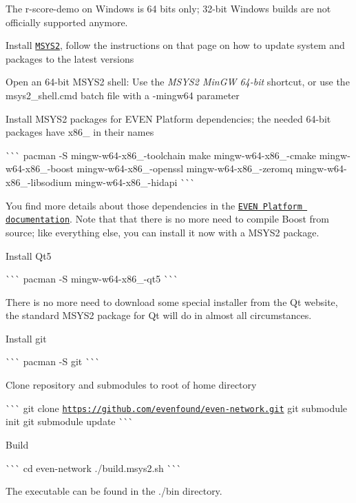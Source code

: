 The r-\/score-\/demo on Windows is 64 bits only; 32-\/bit Windows builds are not officially supported anymore.


\begin{DoxyEnumerate}
\item Install \href{https://www.msys2.org/}{\tt M\+S\+Y\+S2}, follow the instructions on that page on how to update system and packages to the latest versions
\item Open an 64-\/bit M\+S\+Y\+S2 shell\+: Use the {\itshape M\+S\+Y\+S2 Min\+GW 64-\/bit} shortcut, or use the {\ttfamily msys2\+\_\+shell.\+cmd} batch file with a {\ttfamily -\/mingw64} parameter
\item Install M\+S\+Y\+S2 packages for E\+V\+EN Platform dependencies; the needed 64-\/bit packages have {\ttfamily x86\+\_} in their names

\`{}\`{}\`{} pacman -\/S mingw-\/w64-\/x86\+\_-\/toolchain make mingw-\/w64-\/x86\+\_-\/cmake mingw-\/w64-\/x86\+\_-\/boost mingw-\/w64-\/x86\+\_-\/openssl mingw-\/w64-\/x86\+\_-\/zeromq mingw-\/w64-\/x86\+\_-\/libsodium mingw-\/w64-\/x86\+\_-\/hidapi \`{}\`{}\`{}

You find more details about those dependencies in the \href{https://github.com/evenfound/even-network/doc}{\tt E\+V\+EN Platform documentation}. Note that that there is no more need to compile Boost from source; like everything else, you can install it now with a M\+S\+Y\+S2 package.
\item Install Qt5

\`{}\`{}\`{} pacman -\/S mingw-\/w64-\/x86\+\_-\/qt5 \`{}\`{}\`{}

There is no more need to download some special installer from the Qt website, the standard M\+S\+Y\+S2 package for Qt will do in almost all circumstances.
\item Install git

\`{}\`{}\`{} pacman -\/S git \`{}\`{}\`{}
\item Clone repository and submodules to root of home directory

\`{}\`{}\`{} git clone \href{https://github.com/evenfound/even-network.git}{\tt https\+://github.\+com/evenfound/even-\/network.\+git} git submodule init git submodule update \`{}\`{}\`{}
\item Build

\`{}\`{}\`{} cd even-\/network ./build.msys2.\+sh \`{}\`{}\`{}
\end{DoxyEnumerate}

The executable can be found in the {\ttfamily ./bin} directory. 